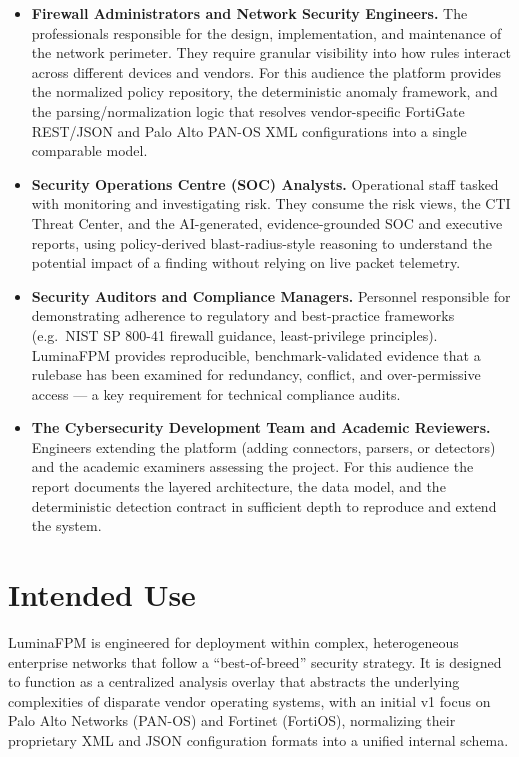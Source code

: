 \begin{itemize}[leftmargin=1.4em]
  \item \textbf{Firewall Administrators and Network Security Engineers.} The professionals responsible for the design, implementation, and maintenance of the network perimeter. They require granular visibility into how rules interact across different devices and vendors. For this audience the platform provides the normalized policy repository, the deterministic anomaly framework, and the parsing/normalization logic that resolves vendor-specific FortiGate REST/JSON and Palo Alto PAN-OS XML configurations into a single comparable model.
  \item \textbf{Security Operations Centre (SOC) Analysts.} Operational staff tasked with monitoring and investigating risk. They consume the risk views, the CTI Threat Center, and the AI-generated, evidence-grounded SOC and executive reports, using policy-derived blast-radius-style reasoning to understand the potential impact of a finding without relying on live packet telemetry.
  \item \textbf{Security Auditors and Compliance Managers.} Personnel responsible for demonstrating adherence to regulatory and best-practice frameworks (e.g.\ NIST SP 800-41 firewall guidance, least-privilege principles). LuminaFPM provides reproducible, benchmark-validated evidence that a rulebase has been examined for redundancy, conflict, and over-permissive access --- a key requirement for technical compliance audits.
  \item \textbf{The Cybersecurity Development Team and Academic Reviewers.} Engineers extending the platform (adding connectors, parsers, or detectors) and the academic examiners assessing the project. For this audience the report documents the layered architecture, the data model, and the deterministic detection contract in sufficient depth to reproduce and extend the system.
\end{itemize}

\section{Intended Use}
\label{sec:ch1-use}

LuminaFPM is engineered for deployment within complex, heterogeneous enterprise networks that follow a ``best-of-breed'' security strategy. It is designed to function as a centralized analysis overlay that abstracts the underlying complexities of disparate vendor operating systems, with an initial v1 focus on Palo Alto Networks (PAN-OS) and Fortinet (FortiOS), normalizing their proprietary XML and JSON configuration formats into a unified internal schema.

